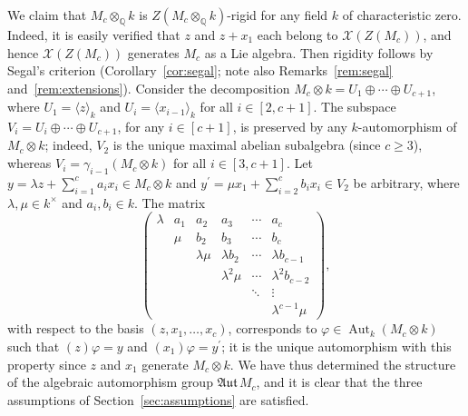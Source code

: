 \documentclass[11pt,a4paper]{amsart}
\theoremstyle{plain}
\theoremstyle{remark}
\newcommand{\Q}{\mathbb{Q}}
\newcommand{\tensor}{\otimes}
\DeclareMathOperator{\Aut}{Aut}
\def \aAut {\mathfrak{Aut} \,}
\begin{document}
We claim that $M_{c} \tensor_\Q k$ is $Z(M_{c} \tensor_\Q k)$-rigid for any field $k$ of characteristic zero.  Indeed, it is easily verified that $z$ and $z + x_1$ each belong to $\mathcal{X}(Z(M_{c}))$, and hence $\mathcal{X}(Z(M_{c}))$ generates $M_{c}$ as a Lie algebra.  Then rigidity follows by Segal's criterion (Corollary~\ref{cor:segal}; note also Remarks~\ref{rem:segal} and~\ref{rem:extensions}).
Consider the decomposition $M_{c} \tensor k = U_1 \oplus \cdots \oplus U_{c+1}$, where $U_1 = \langle z \rangle_k$ and $U_i = \langle x_{i-1} \rangle_k$ for all $i \in [2,c+1]$.  The subspace $V_i = U_i \oplus \cdots \oplus U_{c+1}$, for any $i \in [c+1]$, is preserved by any $k$-automorphism of $M_{c} \tensor k$; indeed, $V_2$ is the unique maximal abelian subalgebra (since $c \geq 3$), whereas $V_i = \gamma_{i-1} (M_{c} \tensor k)$ for all $i \in [3,c+1]$.  Let
$y = \lambda z + \sum_{i = 1}^c a_i x_i \in M_{c} \tensor k$ and $y^\prime = \mu x_1 + \sum_{i = 2}^c b_i x_i \in V_2$ be arbitrary, where $\lambda, \mu \in k^\times$ and $a_i, b_i \in k$.  The matrix
\begin{equation} \label{equ:max.class.matrix}
\left(
\begin{array}{cccccc}
\lambda & a_1 & a_2 & a_3 & \cdots & a_c \\
& \mu & b_2 & b_3 & \cdots & b_{c} \\
& & \lambda \mu & \lambda b_2  & \cdots & \lambda b_{c-1} \\
&&& \lambda^2 \mu & \cdots & \lambda^2 b_{c-2} \\
&&&& \ddots & \vdots \\
&&&&& \lambda^{c-1} \mu
\end{array} \right),
\end{equation}
with respect to the basis $(z, x_1, \dots, x_c)$, corresponds to $\varphi \in \Aut_k (M_{c} \tensor k)$ such that $(z)\varphi = y$ and $(x_1)\varphi = y^\prime$; it is the unique automorphism with this property since $z$ and $x_1$ generate $M_{c} \tensor k$.  We have thus determined the structure of the algebraic automorphism group $\aAut M_{c}$, and it is clear that the three assumptions of Section~\ref{sec:assumptions} are satisfied.
\end{document}

